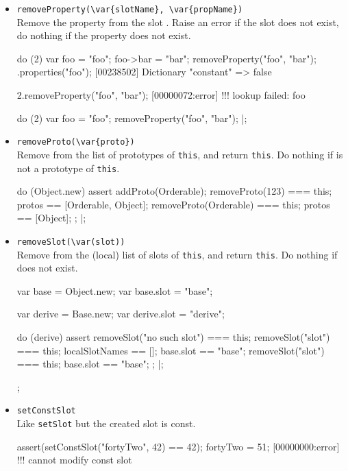 \begin{itemize}
\item \lstinline|removeProperty(\var{slotName}, \var{propName})|\\
  Remove the property  from the slot .
  Raise an error if the slot does not exist, do nothing if the
  property does not exist.
\begin{urbiscript}
do (2)
{
  var foo = "foo";
  foo->bar = "bar";
  removeProperty("foo", "bar");
}.properties("foo");
[00238502] Dictionary {"constant" => false}

2.removeProperty("foo", "bar");
[00000072:error] !!! lookup failed: foo

do (2)
{
  var foo = "foo";
  removeProperty("foo", "bar");
}|;
\end{urbiscript}

\item \lstinline|removeProto(\var{proto})|\\
  Remove  from the list of prototypes of \lstinline|this|,
  and return \lstinline|this|.  Do nothing if  is not a
  prototype of \lstinline|this|.
\begin{urbiscript}
do (Object.new)
{
  assert
  {
    addProto(Orderable);
    removeProto(123) === this;
    protos == [Orderable, Object];
    removeProto(Orderable) === this;
    protos == [Object];
  };
}|;
\end{urbiscript}

\item \lstinline|removeSlot(\var(slot))|\\
  Remove  from the (local) list of slots of
  \lstinline|this|, and return \lstinline|this|.  Do nothing if
   does not exist.
\begin{urbiscript}
{
  var base = Object.new;
  var base.slot = "base";

  var derive = Base.new;
  var derive.slot = "derive";

  do (derive)
  {
    assert
    {
      removeSlot("no such slot") === this;
      removeSlot("slot") === this;
      localSlotNames == [];
      base.slot == "base";
      removeSlot("slot") === this;
      base.slot == "base";
    };
  }|;
};
\end{urbiscript}


\item \lstinline|setConstSlot|\\
  Like \lstinline|setSlot| but the created slot is const.
\begin{urbiscript}
assert(setConstSlot("fortyTwo", 42) == 42);
fortyTwo = 51;
[00000000:error] !!! cannot modify const slot
\end{urbiscript}


\end{itemize}
